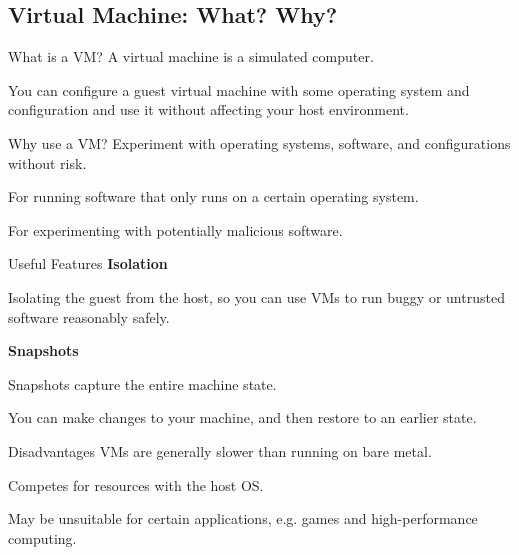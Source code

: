 \documentclass[12pt]{beamer}
\begin{document}
\subsection{Virtual Machine: What? Why?}
\begin{frame}{What is a VM?}
  A virtual machine is a simulated computer.

  You can configure a guest virtual machine with some operating system and configuration and use it without affecting your host environment.
\end{frame}

\begin{frame}{Why use a VM?}
  Experiment with operating systems, software, and configurations without risk.

  For running software that only runs on a certain operating system.

  For experimenting with potentially malicious software.
\end{frame}

\begin{frame}{Useful Features}
  \textbf{Isolation}

  Isolating the guest from the host, so you can use VMs to run buggy or untrusted software reasonably safely.

  \textbf{Snapshots}

  Snapshots capture the entire machine state.

  You can make changes to your machine, and then restore to an earlier state.

\end{frame}

\begin{frame}{Disadvantages}
  VMs are generally slower than running on bare metal.

  Competes for resources with the host OS.

  May be unsuitable for certain applications, e.g. games and high-performance computing.
\end{frame}
\end{document}
